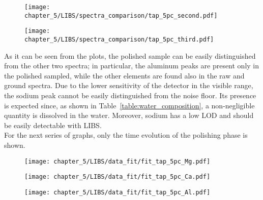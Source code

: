\vspace*{-68pt}
\begin{figure}[H]
    \centering
    \texttt{[image: chapter\_5/LIBS/spectra\_comparison/tap\_5pc\_second.pdf]} 
 \end{figure}

\vspace*{-68pt}
\begin{figure}[H]
    \centering
    \texttt{[image: chapter\_5/LIBS/spectra\_comparison/tap\_5pc\_third.pdf]} 
 \end{figure}

 As it can be seen from the plots, the polished sample can be easily distinguished from the other two spectra; in particular, the aluminum peaks are present only in the polished sampled, while the other elements are found also in the raw and ground spectra. Due to the lower sensitivity of the detector in the visible range, the sodium peak cannot be easily distinguished from the noise floor. Its presence is expected since, as shown in Table~\ref{table:water_composition}, a non-negligible quantity is dissolved in the water. Moreover, sodium has a low LOD and should be easily detectable with LIBS.
\\
For the next series of graphs, only the time evolution of the polishing phase is shown.
\begin{figure}[H]
    \centering
    \texttt{[image: chapter\_5/LIBS/data\_fit/fit\_tap\_5pc\_Mg.pdf]} 
 \end{figure}
\vspace*{-48pt}
 \begin{figure}[H]
    \centering
    \texttt{[image: chapter\_5/LIBS/data\_fit/fit\_tap\_5pc\_Ca.pdf]} 
 \end{figure}
 \begin{figure}[H]
    \centering
    \texttt{[image: chapter\_5/LIBS/data\_fit/fit\_tap\_5pc\_Al.pdf]} 
 \end{figure}

